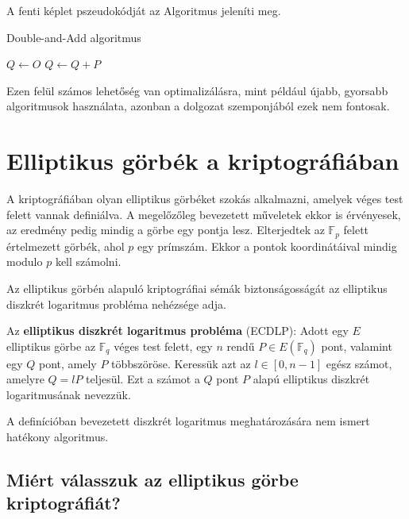 A fenti képlet pszeudokódját az Algoritmus  jeleníti meg.
\begin{algorithm}[H]
    \caption{Double-and-Add algoritmus}
    \label{algorithm:doubleAndAdd}
    \begin{algorithmic}
         
        \State $Q \gets O$
                \State $Q \gets Q + P$
            \EndIf
        \EndFor
        \State {}
        \EndProcedure
    \end{algorithmic}
\end{algorithm}

Ezen felül számos lehetőség van optimalizálásra, mint például újabb, gyorsabb algoritmusok használata, azonban a dolgozat szemponjából ezek nem fontosak.

\section{Elliptikus görbék a kriptográfiában}

A kriptográfiában olyan elliptikus görbéket szokás alkalmazni, amelyek véges test felett vannak definiálva. A megelőzőleg bevezetett műveletek ekkor is érvényesek, az
eredmény pedig mindig a görbe egy pontja lesz. Elterjedtek az $\mathbb{F}_p$ felett értelmezett görbék, ahol $p$ egy prímszám. Ekkor a pontok koordinátáival mindig modulo $p$ kell számolni.

Az elliptikus görbén alapuló kriptográfiai sémák biztonságosságát az elliptikus diszkrét logaritmus probléma nehézsége adja.

\begin{definition*}
Az \textbf{elliptikus diszkrét logaritmus probléma} (ECDLP): Adott egy $E$ elliptikus görbe az $\mathbb{F}_q$ véges test felett, egy $n$ rendű $P \in E(\mathbb{F}_q)$ pont, valamint egy $Q$ pont, amely $P$ többszöröse. Keressük azt az $l \in [0, n - 1]$ egész számot, amelyre $Q = lP$ teljesül. Ezt a számot a $Q$ pont $P$ alapú elliptikus diszkrét logaritmusának nevezzük.
\end{definition*}

A definícióban bevezetett diszkrét logaritmus meghatározására nem ismert hatékony algoritmus.

\subsection{Miért válasszuk az elliptikus görbe kriptográfiát?}

